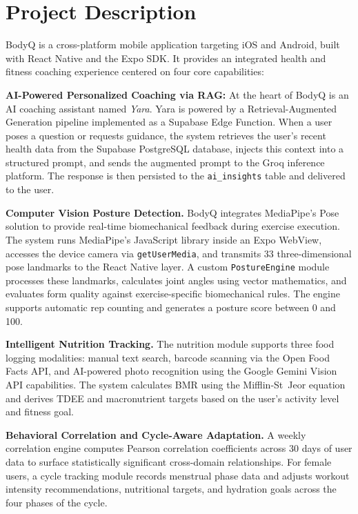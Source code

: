 \section{Project Description}

BodyQ is a cross-platform mobile application targeting iOS and Android,
built with React Native and the Expo SDK. It provides an integrated
health and fitness coaching experience centered on four core capabilities:

\textbf{AI-Powered Personalized Coaching via RAG:} At the heart of BodyQ is an AI coaching assistant named \textit{Yara}. Yara is powered by a Retrieval-Augmented Generation pipeline implemented as a Supabase Edge Function. When a user poses a question or requests guidance, the system retrieves the user's recent health data from the Supabase PostgreSQL database, injects this context into a structured prompt, and sends the augmented prompt to the Groq inference
platform. The response is then persisted to the \texttt{ai\_insights} table and delivered to the user.

\textbf{Computer Vision Posture Detection.} BodyQ integrates
MediaPipe's Pose solution to provide real-time biomechanical feedback during exercise execution. The system runs MediaPipe's JavaScript library inside an Expo WebView, accesses the device camera via \texttt{getUserMedia}, and transmits 33 three-dimensional pose landmarks to the React Native layer. A custom \texttt{PostureEngine} module processes these landmarks, calculates joint angles using vector mathematics, and evaluates form quality against exercise-specific biomechanical rules. The engine supports automatic rep counting and generates a posture score between 0 and 100.

\textbf{Intelligent Nutrition Tracking.} The nutrition module supports three food logging modalities: manual text search, barcode scanning via the Open Food Facts API, and AI-powered photo recognition using the Google Gemini Vision API capabilities. The system calculates BMR using the Mifflin-St~Jeor equation and derives TDEE and macronutrient targets based on the user's activity level and fitness goal.

\textbf{Behavioral Correlation and Cycle-Aware Adaptation.} A weekly
correlation engine computes Pearson correlation coefficients across
30 days of user data to surface statistically significant cross-domain
relationships. For female users, a cycle tracking module records
menstrual phase data and adjusts workout intensity recommendations,
nutritional targets, and hydration goals across the four phases of the
cycle.

